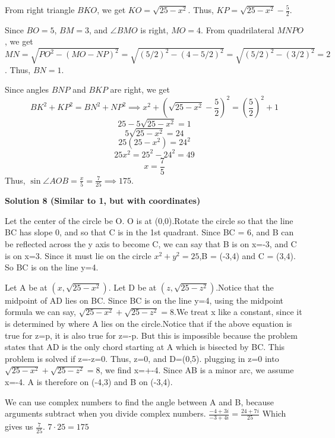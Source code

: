 \begin{enumerate}
 From right triangle $BKO$, we get $KO = \sqrt{25-x^2}$. Thus, $KP = \sqrt{25-x^2}-\frac52$.

 Since $BO = 5$, $BM = 3$, and $\angle BMO$ is right, $MO=4$. From quadrilateral $MNPO$, we get $MN = \sqrt{PO^2 - (MO - NP)^2} = \sqrt{(5/2)^2 - (4 - 5/2)^2} = \sqrt{(5/2)^2 - (3/2)^2} = 2$. Thus, $BN = 1$.

 Since angles $BNP$ and $BKP$ are right, we get 
 \[BK^2+KP^2 = BN^2 + NP^2 \implies x^2 + \left(\sqrt{25-x^2}-\frac52\right)^2 = \left(\frac52\right)^2 + 1\]
 \[25 - 5\sqrt{25-x^2} = 1\]
 \[5\sqrt{25-x^2} = 24\]
 \[25(25-x^2) = 24^2\]
 \[25x^2 = 25^2 - 24^2 = 49\]
 \[x = \frac75\]Thus, $\sin \angle AOB = \frac{x}{5} = \frac{7}{25}\implies \boxed{175}$.

 



\textbf{Solution 8 (Similar to 1, but with coordinates)}

Let the center of the circle be O. O is at (0,0).Rotate the circle so that the line BC has slope 0, and so that C is in the 1st quadrant. Since BC = 6, and B can be reflected across the y axis to become C, we can say that B is on x=-3, and C is on x=3. Since it must lie on the circle $x^2+y^2=25$,B = (-3,4) and C = (3,4). So BC is on the line y=4.

 Let A be at $(x,\sqrt{25-x^2})$. Let D be at $(z,\sqrt{25-z^2})$.Notice that the midpoint of AD lies on BC. Since BC is on the line y=4, using the midpoint formula we can say, $\sqrt{25-x^2} + \sqrt{25-z^2} = 8$.We treat x like a constant, since it is determined by where A lies on the circle.Notice that if the above equation is true for z=p, it is also true for z=-p. But this is impossible because the problem states that AD is the only chord starting at A which is bisected by BC. This problem is solved if z=-z=0. Thus, z=0, and D=(0,5). plugging in z=0 into $\sqrt{25-x^2} + \sqrt{25-z^2} = 8$, we find x=+-4. Since AB is a minor arc, we assume x=-4. A is therefore on (-4,3) and B on (-3,4).

 We can use complex numbers to find the angle between A and B, because arguments subtract when you divide complex numbers. $\frac{-4+3i}{-3+4i} = \frac{24+7i}{25}$ Which gives us $\frac{7}{25}$. $7 \cdot 25 = \boxed{175}$



\end{enumerate}